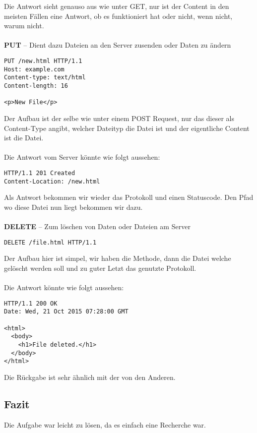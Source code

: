 Die Antwort sieht genauso aus wie unter GET, nur ist der Content in den meisten Fällen eine Antwort, ob es funktioniert hat oder nicht, wenn nicht, warum nicht.\\\\

\textbf{PUT} -- Dient dazu Dateien an den Server zusenden oder Daten zu ändern
\begin{lstlisting}
PUT /new.html HTTP/1.1
Host: example.com
Content-type: text/html
Content-length: 16

<p>New File</p>
\end{lstlisting}
Der Aufbau ist der selbe wie unter einem POST Request, nur das dieser als Content-Type angibt, welcher Dateityp die Datei ist und der eigentliche Content ist die Datei.\\\\Die Antwort vom Server könnte wie folgt aussehen:
\begin{lstlisting}
HTTP/1.1 201 Created
Content-Location: /new.html
\end{lstlisting}
Als Antwort bekommen wir wieder das Protokoll und einen Statuscode. Den Pfad wo diese Datei nun liegt bekommen wir dazu.\\\\

\textbf{DELETE} -- Zum löschen von Daten oder Dateien am Server
\begin{lstlisting}
DELETE /file.html HTTP/1.1
\end{lstlisting}
Der Aufbau hier ist simpel, wir haben die Methode, dann die Datei welche gelöscht werden soll und zu guter Letzt das genutzte Protokoll.\\\\Die Antwort könnte wie folgt aussehen:
\begin{lstlisting}
HTTP/1.1 200 OK 
Date: Wed, 21 Oct 2015 07:28:00 GMT

<html>
  <body>
    <h1>File deleted.</h1> 
  </body>
</html>
\end{lstlisting}
Die Rückgabe ist sehr ähnlich mit der von den Anderen.

\subsection{Fazit}
Die Aufgabe war leicht zu lösen, da es einfach eine Recherche war.

